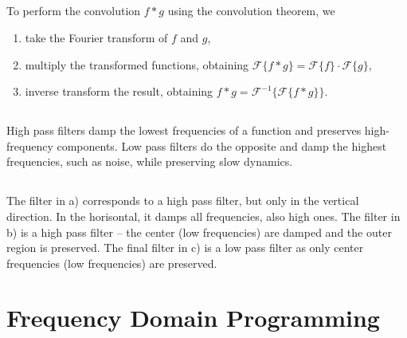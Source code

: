 \documentclass[]{article}
\begin{document}
\subsection{}
To perform the convolution $f * g$ using the convolution theorem, we
\begin{enumerate}
\item take the Fourier transform of $f$ and $g$,
\item multiply the transformed functions, obtaining $\mathcal{F}\{f*g\} = \mathcal{F}\{f\} \cdot \mathcal{F}\{g\}$,
\item inverse transform the result, obtaining $f * g = \mathcal{F}^{-1}\{\mathcal{F}\{f*g\}\}$.
\end{enumerate}

\subsection{}
High pass filters damp the lowest frequencies of a function and preserves high-frequency components. Low pass filters do the opposite and damp the highest frequencies, such as noise, while preserving slow dynamics.

\subsection{}
The filter in a) corresponds to a high pass filter, but only in the vertical direction. In the horisontal, it damps all frequencies, also high ones. The filter in b) is a high pass filter – the center (low frequencies) are damped and the outer region is preserved. The final filter in c) is a low pass filter as only center frequencies (low frequencies) are preserved.

\section{Frequency Domain Programming}
\end{document}
